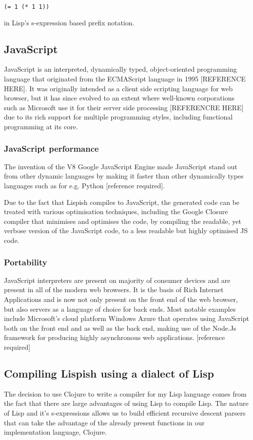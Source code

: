 \begin{lstlisting}
(= 1 (* 1 1))
\end{lstlisting}
in Lisp's s-expression based prefix notation.

\subsection{JavaScript}
JavaScript is an interpreted, dynamically typed, object-oriented programming language that originated from the ECMAScript language in 1995 [REFERENCE HERE]. It was originally intended as a client side scripting language for web browser, but it has since evolved to an extent where well-known corporations such as Microsoft use it for their server side processing [REFERENCRE HERE] due to its rich support for multiple programming styles, including functional programming at its core.

\subsubsection{JavaScript performance}
The invention of the V8 Google JavaScript Engine made JavaScript stand out from other dynamic languages by making it faster than other dynamically types languages such as for e.g. Python [reference required].

Due to the fact that Lispish compiles to JavaScript, the generated code can be treated with various optimisation techniques, including the Google Closure compiler that minimises and optimises the code, by compiling the readable, yet verbose version of the JavaScript code, to a less readable but highly optimised JS code. 

\subsubsection{Portability}
JavaScript interpreters are present on majority of consumer devices and are present in all of the modern web browsers. It is the basis of Rich Internet Applications and is now not only present on the front end of the web browser, but also servers as a language of choice for back ends.
Most notable examples include Microsoft's cloud platform Windows Azure that operates using JavaScript both on the front end and as well as the back end, making use of the Node.Js framework for producing highly asynchronous web applications. [reference required]

\subsection{Compiling Lispish using a dialect of Lisp}
The decision to use Clojure to write a compiler for my Lisp language comes from the fact that there are large advantages of using Lisp to compile Lisp.
The nature of Lisp and it's s-expressions allows us to build efficient recursive descent parsers that can take the advantage of the already present functions in our implementation language, Clojure.

